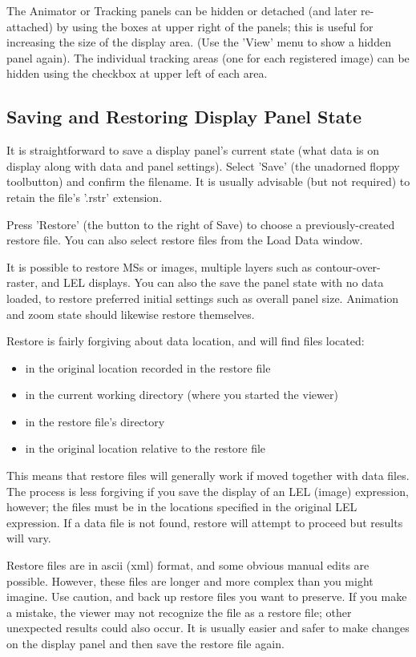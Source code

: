 The Animator or Tracking panels can be hidden or detached (and later
re-attached) by using the boxes at upper right of the panels; this is
useful for increasing the size of the display area.  (Use the 'View'
menu to show a hidden panel again).  The individual tracking areas
(one for each registered image) can be hidden using the checkbox at
upper left of each area.


\subsection{Saving and Restoring Display Panel State}
\label{section:display.viewerGUI.save-restore}

It is straightforward to save a display panel's current state (what
data is on display along with data and panel settings).  Select 'Save'
(the unadorned floppy toolbutton) and confirm the filename.  It is usually
advisable (but not required) to retain the file's '.rstr' extension.  

Press 'Restore' (the button to the right of Save) to choose a
previously-created restore file.  You can also select restore files from
the Load Data window.

It is possible to restore MSs or images, multiple layers such as
contour-over-raster, and LEL displays.  You can also the save the panel
state with no data loaded, to restore preferred initial settings such
as overall panel size.  Animation and zoom state should
likewise restore themselves.

Restore is fairly forgiving about data location, and will find files located:
\begin{itemize}
  \item in the original location recorded in the restore file
  \item in the current working directory (where you started the viewer)
  \item in the restore file's directory
  \item in the original location relative to the restore file
\end{itemize}
This means that restore files will generally work if moved together with
data files.  The process is less forgiving if you save the display of an
LEL (image) expression, however; the files must be in the locations specified
in the original LEL expression.  If a data file is not found, restore will
attempt to proceed but results will vary. 

Restore files are in ascii (xml) format, and some obvious manual edits are
possible.  However, these files are longer and more complex than you might
imagine.  Use caution, and back up restore files you want to preserve.
If you make a mistake, the viewer may not recognize the file as a restore
file; other unexpected results could also occur.  It is usually easier
and safer to make changes on the display panel and then save the restore
file again.

